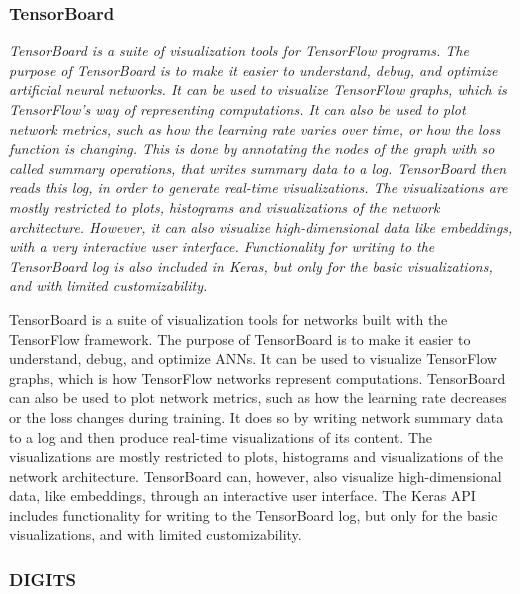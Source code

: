 \subsubsection{TensorBoard}

\textit{TensorBoard is a suite of visualization tools for TensorFlow programs. The purpose of TensorBoard is to make it easier to understand, debug, and optimize artificial neural networks. It can be used to visualize TensorFlow graphs, which is TensorFlow's way of representing computations. It can also be used to plot network metrics, such as how the learning rate varies over time, or how the loss function is changing. This is done by annotating the nodes of the graph with so called summary operations, that writes summary data to a log. TensorBoard then reads this log, in order to generate real-time visualizations. The visualizations are mostly restricted to plots, histograms and visualizations of the network architecture. However, it can also visualize high-dimensional data like embeddings, with a very interactive user interface. Functionality for writing to the TensorBoard log is also included in Keras, but only for the basic visualizations, and with limited customizability.}

TensorBoard is a suite of visualization tools for networks built with the TensorFlow framework. The purpose of TensorBoard is to make it easier to understand, debug, and optimize ANNs. It can be used to visualize TensorFlow graphs, which is how TensorFlow networks represent computations. TensorBoard can also be used to plot network metrics, such as how the learning rate decreases or the loss changes during training. It does so by writing network summary data to a log and then produce real-time visualizations of its content. The visualizations are mostly restricted to plots, histograms and visualizations of the network architecture. TensorBoard can, however, also visualize high-dimensional data, like embeddings, through an interactive user interface. The Keras API includes functionality for writing to the TensorBoard log, but only for the basic visualizations, and with limited customizability.

\begin{comment}
Drawbacks:
- No managing of networks.
- No advanced visualizations.
\end{comment}

\subsubsection{DIGITS}


